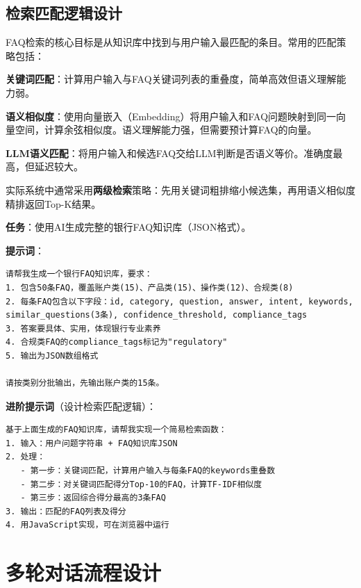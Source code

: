 \subsection{检索匹配逻辑设计}

FAQ检索的核心目标是从知识库中找到与用户输入最匹配的条目。常用的匹配策略包括：

\textbf{关键词匹配}：计算用户输入与FAQ关键词列表的重叠度，简单高效但语义理解能力弱。

\textbf{语义相似度}：使用向量嵌入（Embedding）将用户输入和FAQ问题映射到同一向量空间，计算余弦相似度。语义理解能力强，但需要预计算FAQ的向量。

\textbf{LLM语义匹配}：将用户输入和候选FAQ交给LLM判断是否语义等价。准确度最高，但延迟较大。

实际系统中通常采用\textbf{两级检索}策略：先用关键词粗排缩小候选集，再用语义相似度精排返回Top-K结果。

\begin{practicebox}[用AI构建银行FAQ知识库]
\textbf{任务}：使用AI生成完整的银行FAQ知识库（JSON格式）。

\textbf{提示词}：

\begin{lstlisting}
请帮我生成一个银行FAQ知识库，要求：
1. 包含50条FAQ，覆盖账户类(15)、产品类(15)、操作类(12)、合规类(8)
2. 每条FAQ包含以下字段：id, category, question, answer, intent, keywords, similar_questions(3条), confidence_threshold, compliance_tags
3. 答案要具体、实用，体现银行专业素养
4. 合规类FAQ的compliance_tags标记为"regulatory"
5. 输出为JSON数组格式

请按类别分批输出，先输出账户类的15条。
\end{lstlisting}

\textbf{进阶提示词}（设计检索匹配逻辑）：

\begin{lstlisting}
基于上面生成的FAQ知识库，请帮我实现一个简易检索函数：
1. 输入：用户问题字符串 + FAQ知识库JSON
2. 处理：
   - 第一步：关键词匹配，计算用户输入与每条FAQ的keywords重叠数
   - 第二步：对关键词匹配得分Top-10的FAQ，计算TF-IDF相似度
   - 第三步：返回综合得分最高的3条FAQ
3. 输出：匹配的FAQ列表及得分
4. 用JavaScript实现，可在浏览器中运行
\end{lstlisting}
\end{practicebox}

\section{多轮对话流程设计}

